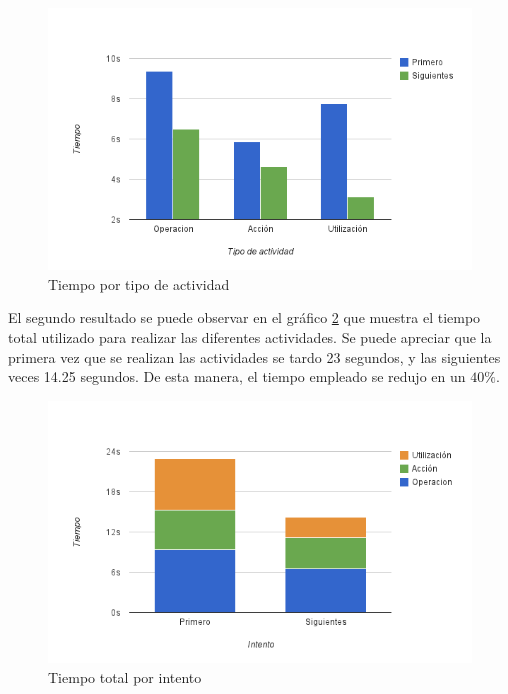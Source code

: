 \begin{figure}[ht!]
\centering
\includegraphics[scale=0.8]{resultados/imagenes/interfaz_tiempo_actividades.png}
\caption{Tiempo por tipo de actividad}
\label{fig:interfaz_tiempo_actividades}
\end{figure}
 
El segundo resultado se puede observar en el gráfico \ref{fig:interfaz_tiempo_total_actividades} que muestra el tiempo total utilizado para realizar las diferentes actividades. Se puede apreciar que la primera vez que se realizan las actividades se tardo 23 segundos, y las siguientes veces 14.25 segundos. De esta manera, el tiempo empleado se redujo en un $40\%$.
 
\begin{figure}[ht!]
\centering
\includegraphics[scale=0.8]{resultados/imagenes/interfaz_tiempo_total_actividades.png}
\caption{Tiempo total por intento}
\label{fig:interfaz_tiempo_total_actividades}
\end{figure}
